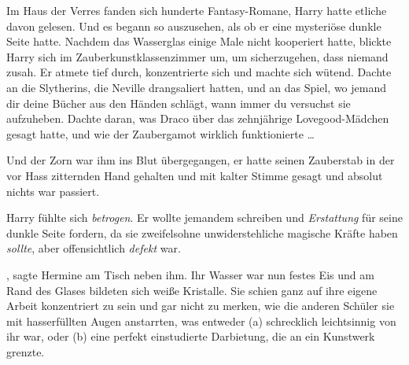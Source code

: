 Im Haus der Verres fanden sich hunderte Fantasy-Romane, Harry hatte etliche davon gelesen. Und es begann so auszusehen, als ob er eine mysteriöse dunkle Seite hatte. Nachdem das Wasserglas einige Male nicht kooperiert hatte, blickte Harry sich im Zauberkunstklassenzimmer um, um sicherzugehen, dass niemand zusah. Er atmete tief durch, konzentrierte sich und machte sich wütend. Dachte an die Slytherins, die Neville drangsaliert hatten, und an das Spiel, wo jemand dir deine Bücher aus den Händen schlägt, wann immer du versuchst sie aufzuheben. Dachte daran, was Draco über das zehnjährige Lovegood-Mädchen gesagt hatte, und wie der Zaubergamot wirklich funktionierte …

Und der Zorn war ihm ins Blut übergegangen, er hatte seinen Zauberstab in der vor Hass zitternden Hand gehalten und mit kalter Stimme  gesagt und absolut nichts war passiert.

Harry fühlte sich \emph{betrogen}. Er wollte jemandem schreiben und \emph{Erstattung} für seine dunkle Seite fordern, da sie zweifelsohne unwiderstehliche magische Kräfte haben \emph{sollte}, aber offensichtlich \emph{defekt} war.

, sagte Hermine am Tisch neben ihm. Ihr Wasser war nun festes Eis und am Rand des Glases bildeten sich weiße Kristalle. Sie schien ganz auf ihre eigene Arbeit konzentriert zu sein und gar nicht zu merken, wie die anderen Schüler sie mit hasserfüllten Augen anstarrten, was entweder (a) schrecklich leichtsinnig von ihr war, oder (b) eine perfekt einstudierte Darbietung, die an ein Kunstwerk grenzte.

